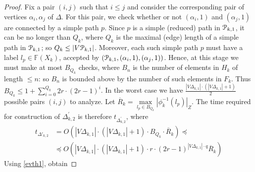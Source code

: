 \documentclass[a4paper,12pt]{article}
\renewcommand{\a}{\alpha }
\newcommand{\G}{\Gamma }
\newcommand{\D}{\Delta }
\newcommand{\T}{\Theta }
\newcommand{\cP}{{\cal{P}}}
\numberwithin{equation}{section}
\numberwithin{figure}{section}
\newcommand{\FF}{\ensuremath{\mathbb{F}}}
\begin{document}
\begin{proof}
Fix a pair $(i, j)$ such that $i \le j$ and consider the
corresponding pair of vertices $\a_i,\a_j$ of $\D$. For this pair, we check
whether or not $(\a_i,1)$ and $(\a_j,1)$ are
connected by a  simple path $p$.
Since $p$ is a
simple (reduced) path in $\cP_{k,1}$, it can be no longer than $Q_k$,
where $Q_k$ is the maximal (edge) length of a simple path in $\cP_{k,1}$;
so $Q_k \le |V\cP_{k,1}|$.
Moreover, each such  simple path $p$ must have a label $l_p \in \FF(X_k)$,
accepted by $(\cP_{k,1},(\a_i,1),(\a_j,1))$. Hence, at
 this stage we must make
at most $B_{Q_k}$ checks, where $B_n$ is the number of elements in
$H_k$ of length $\le n$: so $B_{n}$ is bounded above by the number
of such elements in $F_k$. Thus $B_{Q_k} \le 1+
\mathop{\sum}\limits_{i=0}^{Q_k} 2 r \cdot (2r-1)^{i}$. In the
worst case we have $\frac{|V\D_{k,1}|\cdot(|V\D_{k,1}|+1)}{2}$ possible
pairs $(i,j)$ to analyze. Let $\overline{R}_k=\max\limits_{l_p \in
B_{Q_k}}|\phi^{-1}_k(l_p)|_Z$.
 The time required for construction of $\D_{k,2}^\prime$ is therefore $t_{\D_{k,2}^\prime}$,
where
\begin{equation}\label{pretheta'2}
\begin{split}
t_{\D'_{k,2}} &= O(|V\D_{k,1}|\cdot(|V\D_{k,1}|+1)\cdot B_{Q_k}
\cdot \overline{R}_k)\preceq\\
&\preceq O(|V\D_{k,1}|\cdot(|V\D_{k,1}|+1)\cdot r \cdot
(2r-1)^{|V\D_{k,1}|\cdot q}\overline{R}_k)
\end{split}
\end{equation}
Using \ref{evth1}, obtain


\end{proof}
\end{document}
